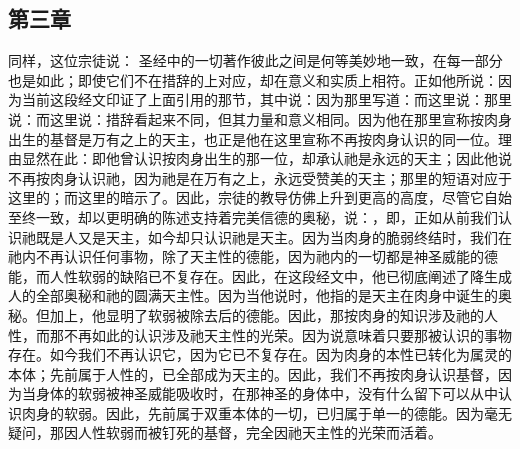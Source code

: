 
\subsection{第三章}

\par

同样，这位宗徒说： 圣经中的一切著作彼此之间是何等美妙地一致，在每一部分也是如此；即使它们不在措辞的上对应，却在意义和实质上相符。正如他所说：因为当前这段经文印证了上面引用的那节，其中说：因为那里写道：而这里说：那里说：而这里说：措辞看起来不同，但其力量和意义相同。因为他在那里宣称按肉身出生的基督是万有之上的天主，也正是他在这里宣称不再按肉身认识的同一位。理由显然在此：即他曾认识按肉身出生的那一位，却承认祂是永远的天主；因此他说不再按肉身认识祂，因为祂是在万有之上，永远受赞美的天主；那里的短语对应于这里的；而这里的暗示了。因此，宗徒的教导仿佛上升到更高的高度，尽管它自始至终一致，却以更明确的陈述支持着完美信德的奥秘，说：，即，正如从前我们认识祂既是人又是天主，如今却只认识祂是天主。因为当肉身的脆弱终结时，我们在祂内不再认识任何事物，除了天主性的德能，因为祂内的一切都是神圣威能的德能，而人性软弱的缺陷已不复存在。因此，在这段经文中，他已彻底阐述了降生成人的全部奥秘和祂的圆满天主性。因为当他说时，他指的是天主在肉身中诞生的奥秘。但加上，他显明了软弱被除去后的德能。因此，那按肉身的知识涉及祂的人性，而那不再如此的认识涉及祂天主性的光荣。因为说意味着只要那被认识的事物存在。如今我们不再认识它，因为它已不复存在。因为肉身的本性已转化为属灵的本体；先前属于人性的，已全部成为天主的。因此，我们不再按肉身认识基督，因为当身体的软弱被神圣威能吸收时，在那神圣的身体中，没有什么留下可以从中认识肉身的软弱。因此，先前属于双重本体的一切，已归属于单一的德能。因为毫无疑问，那因人性软弱而被钉死的基督，完全因祂天主性的光荣而活着。\par


